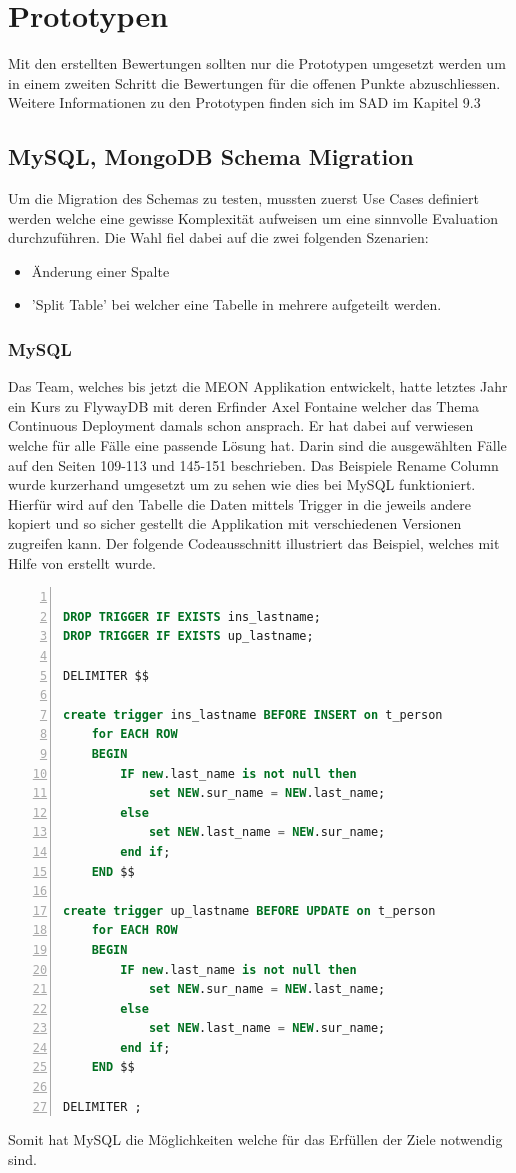 \section{Prototypen}

Mit den erstellten Bewertungen sollten nur die Prototypen umgesetzt werden um in einem zweiten Schritt die Bewertungen für die offenen Punkte abzuschliessen. Weitere Informationen zu den Prototypen finden sich im SAD im Kapitel 9.3

\subsection{MySQL, MongoDB Schema Migration}

Um die Migration des Schemas zu testen, mussten zuerst Use Cases definiert werden welche eine gewisse Komplexität aufweisen um eine sinnvolle Evaluation durchzuführen. Die Wahl fiel dabei auf die zwei folgenden Szenarien:
\begin{itemize}
	\item Änderung einer Spalte
	\item 'Split Table' bei welcher eine Tabelle in mehrere aufgeteilt werden.
\end{itemize}
\newpage
\subsubsection{MySQL}

Das Team, welches bis jetzt die MEON Applikation entwickelt, hatte letztes Jahr ein Kurs zu FlywayDB mit deren Erfinder Axel Fontaine  welcher das Thema Continuous Deployment damals schon ansprach. Er hat dabei auf \cite{rd} verwiesen welche für alle Fälle eine passende Lösung hat. Darin sind die ausgewählten Fälle auf den Seiten 109-113 und 145-151 beschrieben. Das Beispiele Rename Column wurde kurzerhand umgesetzt um zu sehen wie dies bei MySQL funktioniert. Hierfür wird auf den Tabelle die Daten mittels Trigger in die jeweils andere kopiert und so sicher gestellt die Applikation mit verschiedenen Versionen zugreifen kann. Der folgende Codeausschnitt illustriert das Beispiel, welches mit Hilfe von \cite{mysqltrigger} erstellt wurde.

\begin{lstlisting}[language=SQL, showspaces=false, basicstyle=\ttfamily, numbers=left, numberstyle=\tiny, commentstyle=\color{gray}]

DROP TRIGGER IF EXISTS ins_lastname;
DROP TRIGGER IF EXISTS up_lastname;

DELIMITER $$

create trigger ins_lastname BEFORE INSERT on t_person 
	for EACH ROW
	BEGIN
		IF new.last_name is not null then
			set NEW.sur_name = NEW.last_name;
		else
			set NEW.last_name = NEW.sur_name;
		end if;
	END $$

create trigger up_lastname BEFORE UPDATE on t_person
	for EACH ROW
	BEGIN
		IF new.last_name is not null then
			set NEW.sur_name = NEW.last_name;
		else
			set NEW.last_name = NEW.sur_name;
		end if;
	END $$

DELIMITER ;

\end{lstlisting}
Somit hat MySQL die Möglichkeiten welche für das Erfüllen der Ziele notwendig sind.
\newpage
